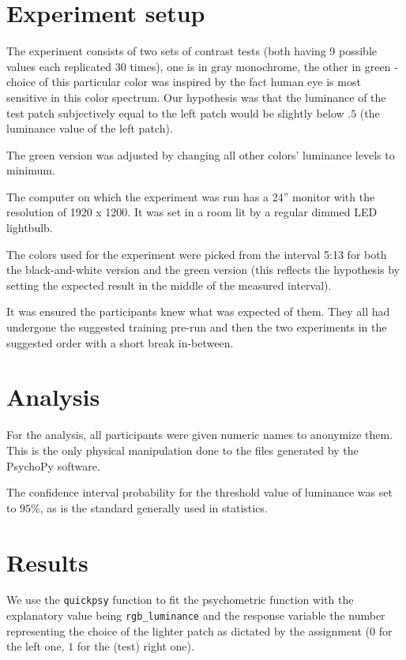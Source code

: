 \documentclass[a4paper,12pt]{article} %
\begin{document}
\section{Experiment setup}

The experiment consists of two sets of contrast tests (both having 9 possible values each replicated 30 times), one is in gray monochrome, the other in green - choice of this particular color was inspired by the fact human eye is most sensitive in this color spectrum. Our hypothesis was that the luminance of the test patch subjectively equal to the left patch would be slightly below $.5$ (the luminance value of the left patch).

The green version was adjusted by changing all other colors' luminance levels to minimum.

The computer on which the experiment was run has a 24'' monitor with the resolution of 1920 x 1200. It was set in a room lit by a regular dimmed LED lightbulb.

The colors used for the experiment were picked from the interval 5:13 for both the black-and-white version and the green version (this reflects the hypothesis by setting the expected result in the middle of the measured interval).

It was ensured the participants knew what was expected of them. They all had undergone the suggested training pre-run and then the two experiments in the suggested order with a short break in-between.

\section{Analysis}

For the analysis, all participants were given numeric names to anonymize them. This is the only physical manipulation done to the files generated by the PsychoPy software.

The confidence interval probability for the threshold value of luminance was set to $95\%$, as is the standard generally used in statistics.

\section{Results}

We use the \lstinline{quickpsy} function to fit the psychometric function with the explanatory value being \lstinline{rgb_luminance} and the response variable the number representing the choice of the lighter patch as dictated by the assignment ($0$ for the left one, $1$ for the (test) right one).
\end{document}
